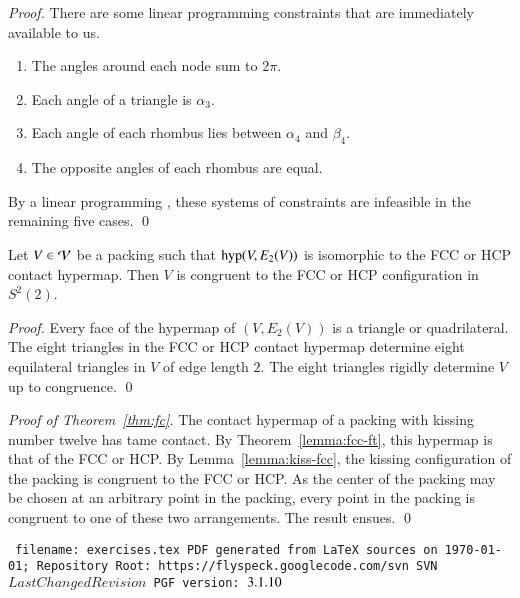 \documentclass{llncs}
\def\op#1{{\hbox{#1}}}
\def\svninfo{{\tt
  filename: exercises.tex\hfill\break
  PDF generated from LaTeX sources on \today; \hfill\break
  Repository Root: https://flyspeck.googlecode.com/svn \hfill\break
  SVN $LastChangedRevision$
  PGF version: $\pgftypesetversion$
  }
  }
\begin{document}
\begin{proof}
\figCXFENOK %


There are some linear
  programming constraints that are immediately available to us.
\begin{enumerate}\wasitemize 
\item The angles around each node sum to $2\pi$.
\item Each angle of a triangle is $\alpha_3$.
\item Each angle of each rhombus lies between $\alpha_4$ and $\beta_4$.
\item The opposite angles of each rhombus are equal.
\end{enumerate}\wasitemize 
By a linear programming ,
these systems of constraints are infeasible in the remaining five cases.
\qed\end{proof}


\begin{lemma}\label{lemma:kiss-fcc}
  Let $V\in {\mathcal V}$ be a packing such that $\op{hyp}(V,E_2(V))$ is
  isomorphic to the FCC or HCP contact hypermap.  Then $V$ is
  congruent to the FCC or HCP configuration in $S^2(2)$.
\end{lemma}
%
%
%
%

\begin{proof} Every face of the hypermap of $(V,E_2(V))$ is a
  triangle or quadrilateral.  The eight triangles in the FCC or HCP
  contact hypermap determine eight equilateral triangles in $V$ of
  edge length $2$.  The eight triangles rigidly determine $V$ up to
  congruence.
\qed\end{proof}

\begin{proof}[Proof of Theorem~\ref{thm:fc}]  
  The contact hypermap of a packing with kissing number twelve has tame
  contact.  By Theorem~\ref{lemma:fcc-ft}, this hypermap is that of
  the FCC or HCP.  By Lemma~\ref{lemma:kiss-fcc}, the kissing
  configuration of the packing is congruent to the FCC or HCP.  As the
  center of the packing may be chosen at an arbitrary point in the
  packing, every point in the packing is congruent to one of these two
  arrangements.  The result ensues.
\qed\end{proof}





\raggedright

%


\newpage
\bigskip
\noindent
\svninfo
\smallskip

\noindent
\endnote
\end{document}
